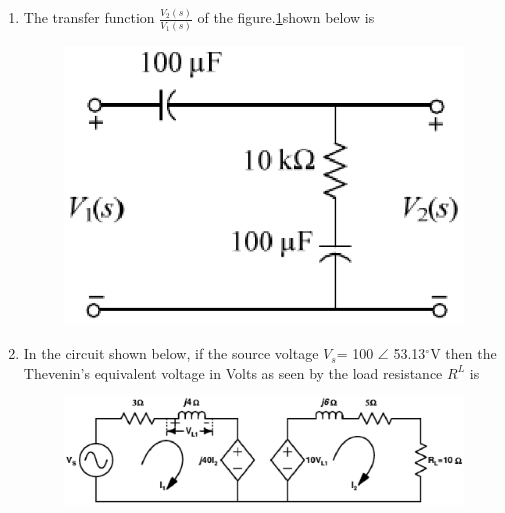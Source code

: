 \documentclass[journal,12pt,twocolumn]{IEEEtran}
\begin{document}
\begin{enumerate}
\item The transfer function $ \frac{V_{2}(s)}{V_{1}(s)} $ of the figure.\ref{fig89}shown below is
\begin{enumerate}
\begin{figure}[!h]
\begin{center}
\includegraphics[scale=0.7]{./figs/fig89.eps}
\caption{}
\label{fig89}
\end{center}
\end{figure}
\end{enumerate}

\item In the circuit shown below, if the source voltage $V_{s}$= 100 $\angle$ 53.13$^\circ$V then the Thevenin’s equivalent voltage in Volts as seen by the load resistance $R^{L}$ is
\begin{enumerate}
\begin{figure}[!h]
\begin{center}
\includegraphics[scale=0.4]{./figs/fig90.eps}
\caption{}
\label{fig90}
\end{center}
\end{figure}
\end{enumerate}
 

\end{enumerate}
\end{document}
